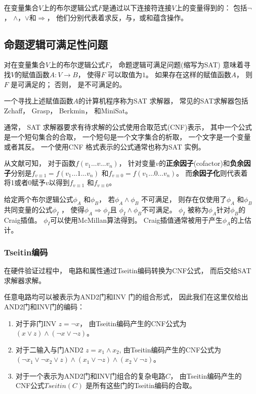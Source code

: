 在变量集合$V$上的布尔逻辑公式$F$是通过以下连接符连接$V$上的变量得到的：
包括$\neg$， $\wedge$，$\vee$和$\Rightarrow$，
他们分别代表着求反，与，或和蕴含操作。

\subsection{命题逻辑可满足性问题}

对在变量集合$V$上的布尔逻辑公式$F$，
命题逻辑可满足问题(缩写为SAT)
意味着寻找$V$的赋值函数$A:V\to B$，
使得$F$ 可以取值为$1$。
如果存在这样的赋值函数$A$，
则$F$ 是可满足的；
否则，
是不可满足的。

一个寻找上述赋值函数$A$的计算机程序称为SAT 求解器，
常见的SAT求解器包括Zchaff，
Grasp，
Berkmin，
和MiniSat。


通常，
SAT 求解器要求有待求解的公式使用合取范式(CNF)表示，
其中一个公式是一个短句集合的合取，
一个短句是一个文字集合的析取，
一个文字是一个变量或者其反。
一个使用CNF 格式表示的公式通常也称为SAT 实例。


从文献可知，
对于函数$f(v_1\dots v\dots v_n)$，
针对变量$v$的\textbf{正余因子}(cofactor)和\textbf{负余因子}分别是$f_{v\equiv 1}=f(v_1\dots 1\dots v_n)$ 和$f_{v\equiv 0}=f(v_1\dots 0\dots v_n)$。
而\textbf{余因子化}则代表着将1或者0赋予$v$以得到$f_{v\equiv 1}$ 和$f_{v\equiv 0}$。

给定两个布尔逻辑公式$\phi_A$ 和$\phi_B$，
若$\phi_A\wedge \phi_B$ 不可满足，
则存在仅使用了$\phi_A$ 和$\phi_B$共同变量的公式$\phi_I$ ，
 使得$\phi_A\Rightarrow \phi_I$且
$\phi_I\wedge \phi_B$不可满足。
$\phi_I$ 被称为$\phi_A$针对$\phi_B$的Craig插值。
$\phi_I$可以使用McMillan算法得到。
Craig插值通常被用于产生$\phi_A$的上估计。

\subsubsection{Tseitin编码}\label{subsubsec_tseitin}
在硬件验证过程中，
电路和属性通过Tseitin编码转换为CNF公式，
而后交给SAT求解器求解。

任意电路均可以被表示为AND2门和INV 门的组合形式，
因此我们在这里仅给出AND2门和INV门的编码：
\begin{enumerate}
\item 对于非门INV $z=\neg x$，
由Tseitin编码产生的CNF公式为$(x\vee z)\wedge( \neg x\vee \neg z)$。
\item 对于二输入与门AND2 $z=x_1\wedge x_2$,
由Tseitin编码产生的CNF公式为$( \neg x_1\vee \neg x_2\vee z)\wedge(x_1\vee \neg z) \wedge(x_2\vee \neg z)$。
\item 对于一个表示为AND2门和INV门组合的复杂电路$C$，
由Tseitin编码产生的CNF公式$Tseitin(C)$ 是所有这些门的Tseitin编码的合取。
\end{enumerate}

